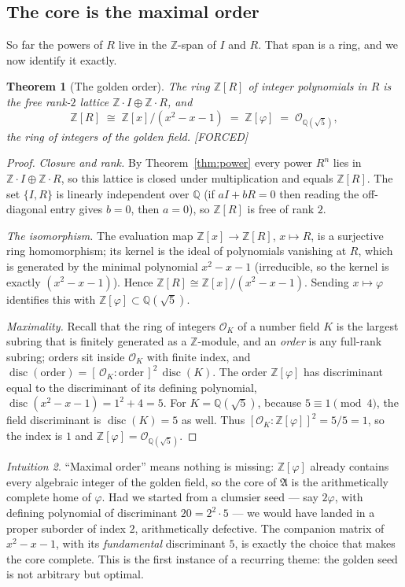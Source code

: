 \documentclass[11pt]{article}
\newcommand{\A}{𝔄}
\newcommand{\OK}{𝒪}
\theoremstyle{plain}
\newtheorem{theorem}{Theorem}[section]
\theoremstyle{definition}
\theoremstyle{remark}
\newtheorem{intuition}[theorem]{Intuition}
\newcommand{\Forced}{\textcolor{forcedc}{[FORCED]}}
\begin{document}
\subsection{The core is the maximal order}
So far the powers of $R$ live in the $ℤ$-span of $I$ and $R$. That span is a ring, and we now identify it exactly.

\begin{theorem}[The golden order]\label{thm:order}
The ring $ℤ[R]$ of integer polynomials in $R$ is the free rank-$2$ lattice $ℤ\!\cdot\! I⊕ℤ\!\cdot\! R$, and
\[
ℤ[R]\;≅\;ℤ[x]/(x^{2}-x-1)\;=\;ℤ[φ]\;=\;\OK_{ℚ(\sqrt5)},
\]
the ring of integers of the golden field. \Forced
\end{theorem}
\begin{proof}
\emph{Closure and rank.} By Theorem~\ref{thm:power} every power $R^{n}$ lies in $ℤ\!\cdot\! I⊕ℤ\!\cdot\! R$, so this lattice is closed under multiplication and equals $ℤ[R]$. The set $\{I,R\}$ is linearly independent over $ℚ$ (if $aI+bR=0$ then reading the off-diagonal entry gives $b=0$, then $a=0$), so $ℤ[R]$ is free of rank $2$.

\emph{The isomorphism.} The evaluation map $ℤ[x]→ℤ[R]$, $x↦R$, is a surjective ring homomorphism; its kernel is the ideal of polynomials vanishing at $R$, which is generated by the minimal polynomial $x^{2}-x-1$ (irreducible, so the kernel is exactly $(x^{2}-x-1)$). Hence $ℤ[R]≅ℤ[x]/(x^{2}-x-1)$. Sending $x↦φ$ identifies this with $ℤ[φ]⊂ℚ(\sqrt5)$.

\emph{Maximality.} Recall that the ring of integers $\OK_{K}$ of a number field $K$ is the largest subring that is finitely generated as a $ℤ$-module, and an \emph{order} is any full-rank subring; orders sit inside $\OK_K$ with finite index, and $\operatorname{disc}(\text{order})=[\,\OK_K:\text{order}\,]^{2}\,\operatorname{disc}(K)$. The order $ℤ[φ]$ has discriminant equal to the discriminant of its defining polynomial, $\operatorname{disc}(x^{2}-x-1)=1^{2}+4=5$. For $K=ℚ(\sqrt5)$, because $5≡1\pmod4$, the field discriminant is $\operatorname{disc}(K)=5$ as well. Thus $[\OK_K:ℤ[φ]]^{2}=5/5=1$, so the index is $1$ and $ℤ[φ]=\OK_{ℚ(\sqrt5)}$.
\end{proof}

\begin{intuition}
``Maximal order'' means nothing is missing: $ℤ[φ]$ already contains every algebraic integer of the golden field, so the core of $\A$ is the arithmetically complete home of $φ$. Had we started from a clumsier seed --- say $2φ$, with defining polynomial of discriminant $20=2^{2}\cdot5$ --- we would have landed in a proper suborder of index $2$, arithmetically defective. The companion matrix of $x^{2}-x-1$, with its \emph{fundamental} discriminant $5$, is exactly the choice that makes the core complete. This is the first instance of a recurring theme: the golden seed is not arbitrary but optimal.
\end{intuition}
\end{document}
